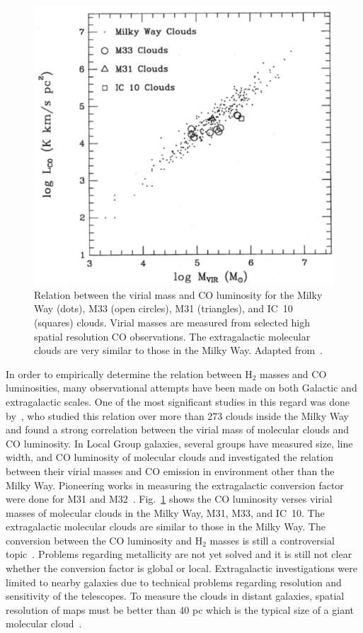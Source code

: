 \begin{figure}
\label{fig: mco_ch}
\centering
\includegraphics[width=16cm]{../image_intro/mvirial_lco.pdf}
\caption{Relation between the virial mass and CO luminosity for the Milky Way (dots), M33 (open circles), M31 (triangles), and IC~10 (squares) clouds. Virial masses are measured from selected high spatial resolution CO observations. The extragalactic molecular clouds are very similar to those in the Milky Way. Adapted from~\cite{Young91}.}
\end{figure}

In order to empirically determine the relation between H$_2$ masses and CO luminosities, many observational attempts have been made on both Galactic and extragalactic scales. 
One of the most significant studies in this regard was done by~\cite{Solomon87}, who studied this relation over more than 273 clouds inside the Milky Way and found a strong correlation between the virial mass of molecular clouds and CO luminosity. 
In Local Group galaxies, several groups have measured size, line width, and CO luminosity of molecular clouds and investigated the relation between  their virial masses and CO emission in environment other than the Milky Way. 
Pioneering works in measuring the extragalactic conversion factor were done for M31 and M32~\citep[e.g.,][]{Wilson89, Wilson90}. 
Fig.~\ref{fig: mco_ch} shows the CO luminosity verses virial masses of molecular clouds in the Milky Way, M31, M33, and IC~10. 
The extragalactic molecular clouds are similar to those in the Milky Way. 
The conversion between the CO luminosity and H$_2$ masses is still a controversial topic~\citep[e.g.][]{Narayanan11, Bolato13, Sandstrom13}.
Problems regarding metallicity are not yet solved and it is still not clear whether the conversion factor is global or local. 
Extragalactic investigations were limited to nearby galaxies due to technical problems regarding resolution and sensitivity of the telescopes. 
To measure the clouds in distant galaxies, spatial resolution of maps must be better than 40 pc which is the typical size of a giant molecular cloud~\citep[e.g.][and refrences therein]{Young91,Bolato13}. 

